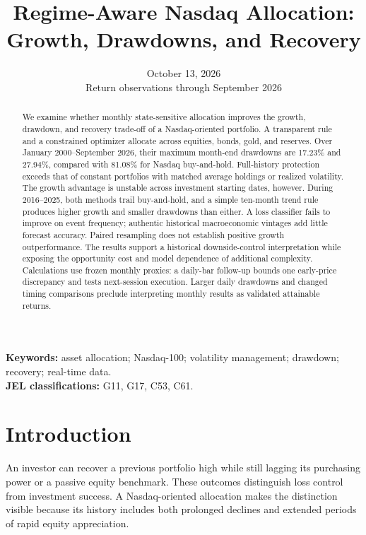 \documentclass[12pt,letterpaper]{article}
\title{\vspace{-1.3cm}\textbf{Regime-Aware Nasdaq Allocation:\\Growth, Drawdowns, and Recovery}}
\date{October 13, 2026\\\small Return observations through September 2026}
\begin{document}
\maketitle\thispagestyle{empty}
\begin{abstract}
We examine whether monthly state-sensitive allocation improves the growth, drawdown, and recovery trade-off of a Nasdaq-oriented portfolio. A transparent rule and a constrained optimizer allocate across equities, bonds, gold, and reserves. Over January 2000--September 2026, their maximum month-end drawdowns are 17.23\% and 27.94\%, compared with 81.08\% for Nasdaq buy-and-hold. Full-history protection exceeds that of constant portfolios with matched average holdings or realized volatility. The growth advantage is unstable across investment starting dates, however. During 2016--2025, both methods trail buy-and-hold, and a simple ten-month trend rule produces higher growth and smaller drawdowns than either. A loss classifier fails to improve on event frequency; authentic historical macroeconomic vintages add little forecast accuracy. Paired resampling does not establish positive growth outperformance. The results support a historical downside-control interpretation while exposing the opportunity cost and model dependence of additional complexity. Calculations use frozen monthly proxies: a daily-bar follow-up bounds one early-price discrepancy and tests next-session execution. Larger daily drawdowns and changed timing comparisons preclude interpreting monthly results as validated attainable returns.
\end{abstract}
\par
\noindent\textbf{Keywords:} asset allocation; Nasdaq-100; volatility management; drawdown; recovery; real-time data.\\
\textbf{JEL classifications:} G11, G17, C53, C61.

\section{Introduction}
An investor can recover a previous portfolio high while still lagging its purchasing power or a passive equity benchmark. These outcomes distinguish loss control from investment success. A Nasdaq-oriented allocation makes the distinction visible because its history includes both prolonged declines and extended periods of rapid equity appreciation.
\end{document}
